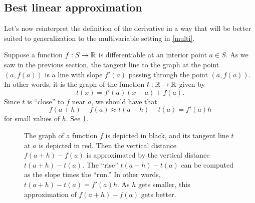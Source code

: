 \subsection{Best linear approximation}

Let's now reinterpret the definition of the derivative in a way that will be better suited to generalization to the multivariable setting in \cref{multi}. 

Suppose a function $f : S \to \mathbb{R}$ is differentiable at an interior point $a \in S$. As we saw in the previous section, the tangent line to the graph at the point $(a, f(a))$ is a line with slope $f'(a)$ passing through the point $(a, f(a))$. In other words, it is the graph of the function $t : \mathbb{R} \to \mathbb{R}$ given by
\[ t(x) = f'(a)(x-a) + f(a). \]
Since $t$ is ``close'' to $f$ near $a$, we should have that
\[ f(a+h)-f(a) \approx t(a+h) - t(a) = f'(a)h \]
for small values of $h$. See \cref{figure-linear-approximation}. 
\begin{figure}[ht]
	\begin{center}
	\end{center}
	\caption{The graph of a function $f$ is depicted in black, and its tangent line $t$ at $a$ is depicted in red. Then the vertical distance $f(a+h)-f(a)$ is approximated by the vertical distance $t(a+h)-t(a)$. The ``rise'' $t(a+h)-t(a)$ can be computed as the slope times the ``run.'' In other words, $t(a+h)-t(a) = f'(a)h$. As $h$ gets smaller, this approximation of $f(a+h) - f(a)$ gets better.}  \label{figure-linear-approximation}
\end{figure}


